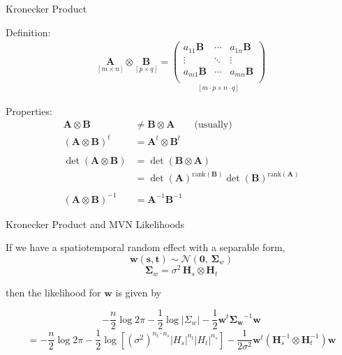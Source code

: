 \documentclass[11pt,ignorenonframetext,]{beamer}
\begin{document}
\begin{frame}{Kronecker Product}
\protect\hypertarget{kronecker-product}{}

Definition: \[
\begin{aligned}
\underset{[m \times n]}{\symbf{A}} \otimes \underset{[p \times q]}{\symbf{B}} = \underset{[m \cdot p \times  n \cdot q]}{\begin{pmatrix}
a_{11} \symbf{B} & \cdots & a_{1n} \symbf{B} \\
\vdots        & \ddots & \vdots        \\
a_{m1} \symbf{B} & \cdots & a_{mn} \symbf{B} \\
\end{pmatrix}}
\end{aligned}
\]

\vspace{4mm}

\pause

Properties: \[
\begin{aligned}
\symbf{A} \otimes \symbf{B}       &\ne \symbf{B} \otimes \symbf{A}  \qquad\text{(usually)} \\ 
(\symbf{A} \otimes \symbf{B})^t   &= \symbf{A}^t \otimes \symbf{B}^t \\ \\
\det(\symbf{A} \otimes \symbf{B}) &= \det(\symbf{B} \otimes \symbf{A}) \\ 
&=\det(\symbf{A})^{\text{rank}(\symbf{B})} \det(\symbf{B})^{\text{rank}(\symbf{A})} \\ \\
(\symbf{A} \otimes \symbf{B})^{-1} &= \symbf{A}^{-1} \symbf{B}^{-1}
\end{aligned}
\]

\end{frame}

\begin{frame}{Kronecker Product and MVN Likelihoods}
\protect\hypertarget{kronecker-product-and-mvn-likelihoods}{}

If we have a spatiotemporal random effect with a separable form, \[
\symbf{w}(\symbf{s},\symbf{t}) \sim \mathcal{N}(\symbf{0},\, \symbf{\Sigma}_w)
\] \[
\symbf{\Sigma}_w = \sigma^2 \, \symbf{H}_s \otimes \symbf{H}_t
\]

then the likelihood for \(\symbf{w}\) is given by

\[
-\frac{n}{2}\log 2\pi - \frac{1}{2} \log |\Sigma_w| - \frac{1}{2} \symbf{w}^t \symbf{\Sigma_w}^{-1} \symbf{w}
\] \[
= -\frac{n}{2}\log 2\pi - \frac{1}{2} \log \left[ (\sigma^2)^{n_t \cdot n_s} |H_s|^{n_t} |H_t|^{n_s}\right] - \frac{1}{2\sigma^2} \symbf{w}^t (\symbf{H}_s^{-1} \otimes \symbf{H}_t^{-1}) \symbf{w}
\]

\end{frame}
\end{document}
